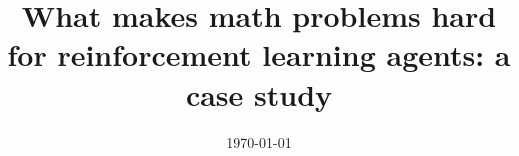 \documentclass{amsart}
\title[What makes math problems hard for RL]{What makes math problems hard for reinforcement learning agents: a case study}
\date{\today}
\begin{document}
	
	\maketitle
	\tableofcontents
	
	
	
	
	
	
	
    
	\appendix
	
	
	
	\sloppy
	\printbibliography
	\todos
\end{document}
